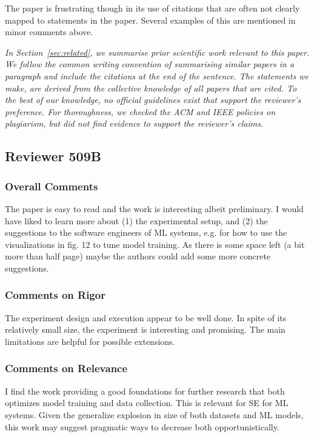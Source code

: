 \documentclass[conference]{IEEEtran}
\newcommand{\highlight}[1]{\begin{framed}%
  \noindent\emph{#1}
\end{framed}}
\begin{document}
The paper is frustrating though in its use of citations that are often
not clearly mapped to statements in the paper. Several examples of
this are mentioned in minor comments above.

\highlight{In Section~\ref{sec:related}, we summarise prior scientific
work relevant to this paper. We follow the common writing convention
of summarising similar papers in a paragraph and include the citations
at the end of the sentence. The statements we make, are derived from
the collective knowledge of all papers that are cited. To the best of
our knowledge, no official guidelines exist that support the
reviewer's preference. For thoroughness, we checked the ACM and IEEE
policies on plagiarism, but did not find evidence to support the
reviewer's claims.}

\subsection{Reviewer 509B}

\subsubsection{Overall Comments}
The paper is easy to read and the work is interesting albeit
preliminary. I would have liked to learn more about (1) the
experimental setup, and (2) the suggestions to the software engineers
of ML systems, e.g. for how to use the visualizations in fig. 12 to
tune model training. As there is some space left (a bit more than half
page) maybe the authors could add some more concrete suggestions.

\subsubsection{Comments on Rigor}
The experiment design and execution appear to be well done. In spite
of its relatively small size, the experiment is interesting and
promising. The main limitations are helpful for possible extensions.

\subsubsection{Comments on Relevance}
I find the work providing a good foundations for further research that
both optimizes model training and data collection. This is relevant
for SE for ML systems. Given the generalize explosion in size of both
datasets and ML models, this work may suggest pragmatic ways to
decrease both opportunistically.
\end{document}
